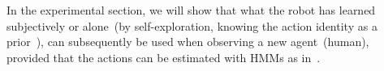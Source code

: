 %

%
%
%

In the experimental section, we will show that what the robot has learned subjectively or alone~(by self-exploration, knowing the action identity as a prior~\cite{salvi:2012:smcb}), can subsequently be used when observing a new agent~(human), provided that the actions can be estimated with \acp{HMM} as in~\cite{saponaro:2013:crhri}.
